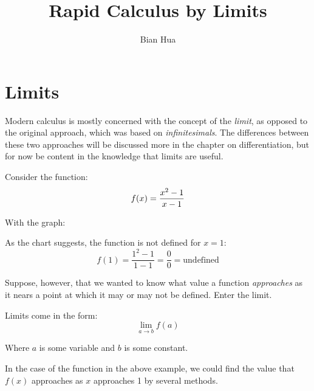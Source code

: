 \documentclass[10pt,a4paper]{book}
\author{Bian Hua}
\title{Rapid Calculus by Limits}
\begin{document}
\maketitle
\tableofcontents

\chapter{Limits}
Modern calculus is mostly concerned with the concept of the \textit{limit}, as opposed to the
original approach, which was based on \textit{infinitesimals}. The differences between these
two approaches will be discussed more in the chapter on differentiation, but for now be content
in the knowledge that limits are useful.

Consider the function:
\[
	f(x)= {{x^2-1}\over{x-1}}
\]

With the graph:


As the chart suggests, the function is not defined for $x=1$:
\[
f(1)= {\frac{1^2-1}{1-1}} = {\frac{0}{0}} = \text{undefined}
\]

Suppose, however, that we wanted to know what value a function \textit{approaches} as it nears
a point at which it may or may not be defined. Enter the limit.

Limits come in the form:
\[
\lim_{a \to b} f(a)
\]

Where $a$ is some variable and $b$ is some constant.

In the case of the function in the above example, we could find the value that $f(x)$ approaches
as $x$ approaches 1 by several methods.
\newline
\end{document}
